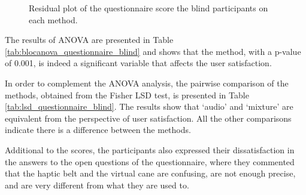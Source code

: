 \begin{figure}[!thb]
\begin{minipage}{0.45\textwidth}
        \caption{Residual plot of the questionnaire score the blind participants on each method.}
        \label{fig:residplot_questionnaire_blind}
    \end{minipage}
\end{figure}

The results of ANOVA are presented in Table  \ref{tab:blocanova_questionnaire_blind} and shows that the method, with a p-value of 0.001, is indeed a significant variable that affects the user satisfaction.



In order to complement the ANOVA analysis, the pairwise comparison of the methods, obtained from the Fisher LSD test, is presented in Table \ref{tab:lsd_questionnaire_blind}. The results show that ‘audio’ and ‘mixture’ are equivalent from the perspective of user satisfaction. All the other comparisons indicate there is a difference between the methods.



Additional to the scores, the participants also expressed their dissatisfaction in the answers to the open questions of the questionnaire, where they commented that the haptic belt and the virtual cane are confusing, are not enough precise, and are very different from what they are used to.

\FloatBarrier